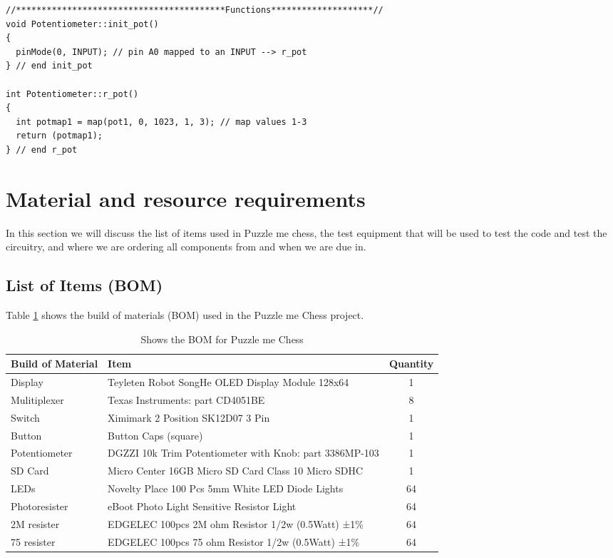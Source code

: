 \documentclass[11pt]{article}
\begin{document}
\begin{lstlisting}[caption={Puzzle me Chess - photentiometer.cpp file},label={Photentiometer}]
//*****************************************Functions********************//
void Potentiometer::init_pot()
{
  pinMode(0, INPUT); // pin A0 mapped to an INPUT --> r_pot 
} // end init_pot

int Potentiometer::r_pot()
{
  int potmap1 = map(pot1, 0, 1023, 1, 3); // map values 1-3 
  return (potmap1);
} // end r_pot
\end{lstlisting}

\section{Material and resource requirements}
In this section we will discuss the list of items used in Puzzle me chess, the test equipment that will be used to test the code and test the circuitry, and where we are ordering all components from and when we are due in. 

\subsection{List of Items (BOM)}
Table \ref{tab:BOM} shows the build of materials (BOM) used in the Puzzle me Chess project. 

\begin{table} 
\begin{center}
    \begin{tabular}{| l | l | c |}
    \hline
    Build of Material  & Item & Quantity \\ \hline
    Display & Teyleten Robot SongHe OLED Display Module 128x64 & 1 \\ \hline
    Mulitiplexer & Texas Instruments: part CD4051BE & 8 \\ \hline 
    Switch & Ximimark 2 Position SK12D07 3 Pin & 1 \\ \hline
    Button & Button Caps (square) & 1 \\ \hline
    Potentiometer & DGZZI 10k Trim Potentiometer with Knob: part 3386MP-103  & 1 \\ \hline
    SD Card & Micro Center 16GB Micro SD Card Class 10 Micro SDHC   & 1 \\ \hline
    LEDs & Novelty Place 100 Pcs 5mm White LED Diode Lights & 64\\ \hline
    Photoresister & eBoot  Photo Light Sensitive Resistor Light & 64\\ \hline
    2M resister & EDGELEC 100pcs 2M ohm Resistor 1/2w (0.5Watt) ±1\% & 64\\ \hline
    75 resister & EDGELEC 100pcs 75 ohm Resistor 1/2w (0.5Watt) ±1\%  & 64\\ \hline
    \end{tabular}
    \caption{Shows the BOM for Puzzle me Chess}
	\label{tab:BOM}
\end{center}
\end{table}
\end{document}
